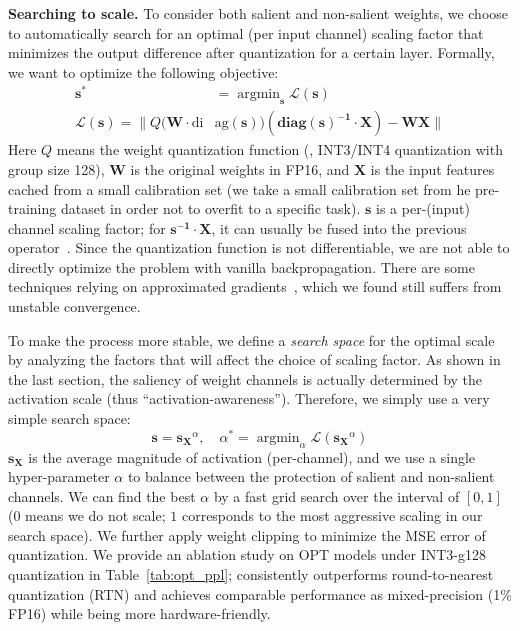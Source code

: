 \textbf{Searching to scale. }
To consider both salient and non-salient weights, we choose to automatically search for an optimal (per input channel) scaling factor that minimizes the output difference after quantization for a certain layer. Formally, we want to optimize the following objective:
\begin{equation}
\begin{aligned}
    \mathbf{s}^* &= \mathop{\arg\min}_{\mathbf{s}} \mathcal{L}(\mathbf{s}) \\  
    \mathcal{L}(\mathbf{s}) = \lVert Q(\mathbf{W}\cdot \text{di}&\text{ag}(\mathbf{s}))  (\mathbf{\text{diag}(s)^{-1}} \cdot \mathbf{X}) - \mathbf{W}\mathbf{X}  \rVert
\end{aligned}
\end{equation}
Here $Q$ means the weight quantization function (\eg, INT3/INT4 quantization with group size 128), $\mathbf{W}$ is the original weights in FP16, and $\mathbf{X}$ is the input features cached from a small calibration set (we take a small calibration set from he pre-training dataset in order not to overfit to a specific task). $\mathbf{s}$ is a per-(input) channel scaling factor; for $\mathbf{s^{-1}} \cdot \mathbf{X}$, it can usually be fused into the previous operator~\cite{wei2022outlier, xiao2022smoothquant}.
Since the quantization function is not differentiable, we are not able to directly optimize the problem with vanilla backpropagation. There are some techniques relying on approximated gradients~\cite{bengio2013estimating, esser2019learned}, which we found still suffers from unstable convergence.  

To make the process more stable, we define a \emph{search space} for the optimal scale by analyzing the factors that will affect the choice of scaling factor. As shown in the last section, the saliency of weight channels is actually determined by the activation scale (thus ``activation-awareness''). Therefore, we simply use a very simple search space:
\begin{equation}
\label{eq:scale_search_formula}
    \mathbf{s}=\mathbf{s_X}^{\alpha}, \quad \alpha^*=\mathop{\arg\min}_{\alpha}\mathcal{L}(\mathbf{s_X}^{\alpha})
\end{equation}
$\mathbf{s_X}$ is the average magnitude of activation (per-channel), and we use a single hyper-parameter $\alpha$ to balance between the protection of salient and non-salient channels. We can find the best $\alpha$ by a fast grid search over the interval of $[0, 1]$ ($0$ means we do not scale; $1$  corresponds to the most aggressive scaling in our search space). We further apply weight clipping to minimize the MSE error of quantization. We provide an ablation study on OPT models under INT3-g128 quantization in Table~\ref{tab:opt_ppl}; \methodshort consistently outperforms round-to-nearest quantization (RTN) and achieves comparable performance as mixed-precision (1\% FP16) while being more hardware-friendly.

